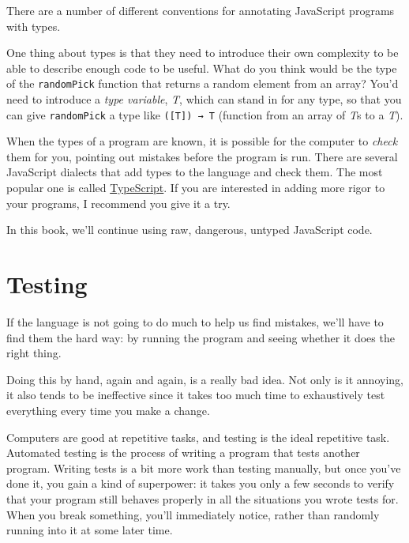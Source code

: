 There are a number of different conventions for annotating JavaScript programs with types.

One thing about types is that they need to introduce their own complexity to be able to describe enough code to be useful. What do you think would be the type of the \lstinline`randomPick` function that returns a random element from an array? You'd need to introduce a \emph{type
variable}, \emph{T}, which can stand in for any type, so that you can give \lstinline`randomPick` a type like \lstinline`([T]) → T` (function from an array of \emph{T}s to a \emph{T}).

\label{error.typing}When the types of a program are known, it is possible for the computer to \emph{check} them for you, pointing out mistakes before the program is run. There are several JavaScript dialects that add types to the language and check them. The most popular one is called \href{https://www.typescriptlang.org/}{TypeScript}. If you are interested in adding more rigor to your programs, I recommend you give it a try.

In this book, we'll continue using raw, dangerous, untyped JavaScript code.

\section{Testing}

If the language is not going to do much to help us find mistakes, we'll have to find them the hard way: by running the program and seeing whether it does the right thing.

Doing this by hand, again and again, is a really bad idea. Not only is it annoying, it also tends to be ineffective since it takes too much time to exhaustively test everything every time you make a change.

Computers are good at repetitive tasks, and testing is the ideal repetitive task. Automated testing is the process of writing a program that tests another program. Writing tests is a bit more work than testing manually, but once you've done it, you gain a kind of superpower: it takes you only a few seconds to verify that your program still behaves properly in all the situations you wrote tests for. When you break something, you'll immediately notice, rather than randomly running into it at some later time.

